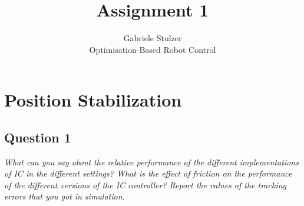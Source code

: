 \documentclass[12pt]{article}
\begin{document}
 
 
\title{Assignment 1}
\author{Gabriele Stulzer\\ 
Optimisation-Based Robot Control}
 
\maketitle

\section*{Position Stabilization}
 
\subsection*{Question 1}
\textit{What can you say about the relative performance of the different implementations of IC in the different settings? What is the effect of friction on the performance of the different versions of the IC controller? Report the values of the tracking errors that you got in simulation.}
\end{document}
